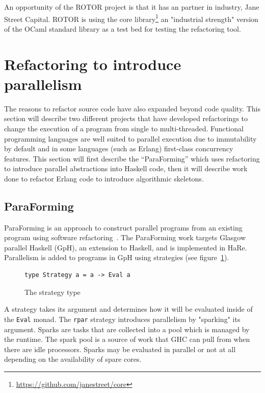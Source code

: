 An opportunity of the ROTOR project is that it has an partner in industry, Jane Street Capital. ROTOR is using the core library\footnote{\url{https://github.com/janestreet/core}} an "industrial strength" version of the OCaml standard library as a test bed for testing the refactoring tool.

\section{Refactoring to introduce parallelism}\label{refacParallel}

The reasons to refactor source code have also expanded beyond code quality. This section will describe two different projects that have developed refactorings to change the execution of a program from single to multi-threaded. Functional programming languages are well suited to parallel execution due to immutability by default and in some languages (such as Erlang) first-class concurrency features. This section will first describe the ``ParaForming'' which uses refactoring to introduce parallel abstractions into Haskell code, then it will describe work done to refactor Erlang code to introduce algorithmic skeletons.

\subsection{ParaForming}  
ParaForming is an approach to construct parallel programs from an existing program using software refactoring~\citep{paraforming}. The ParaForming work targets Glasgow parallel Haskell (GpH), an extension to Haskell, and is implemented in HaRe. Parallelism is added to programs in GpH using strategies (see figure~\ref{strategy}). 

\begin{figure}[t]
\begin{lstlisting}
type Strategy a = a -> Eval a
\end{lstlisting}
\caption{The strategy type}
\label{strategy}
\end{figure}   

A strategy takes its argument and determines how it will be evaluated inside of the \texttt{Eval} monad. The \texttt{rpar} strategy introduces parallelism by "sparking" its argument. Sparks are tasks that are collected into a pool which is managed by the runtime. The spark pool is a source of work that GHC can pull from when there are idle processors. Sparks may be evaluated in parallel or not at all depending on the availability of spare cores.

